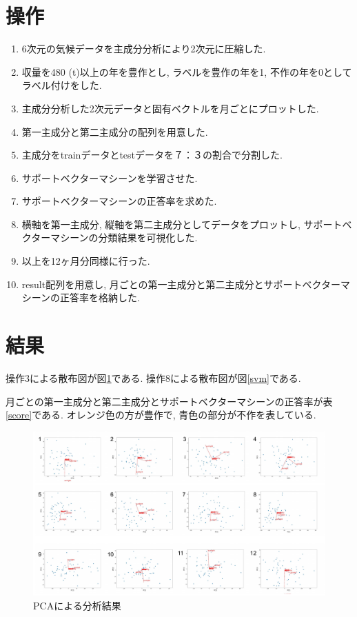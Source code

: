 \documentclass{jarticle}
\begin{document}
\hypertarget{header-n2026}{%
\section{操作}\label{header-n2026}}

\begin{enumerate}
\def\labelenumi{\arabic{enumi}.}
\item
  6次元の気候データを主成分分析により2次元に圧縮した.
\item
  収量を480 (t)以上の年を豊作とし, ラベルを豊作の年を1,
  不作の年を0としてラベル付けをした.
\item
  主成分分析した2次元データと固有ベクトルを月ごとにプロットした.
\item
  第一主成分と第二主成分の配列を用意した.
\item
  主成分をtrainデータとtestデータを７：３の割合で分割した.
\item
  サポートベクターマシーンを学習させた.
\item
  サポートベクターマシーンの正答率を求めた.
\item
  横軸を第一主成分, 縦軸を第二主成分としてデータをプロットし,
  サポートベクターマシーンの分類結果を可視化した.
\item
  以上を12ヶ月分同様に行った.
\item
  result配列を用意し,
  月ごとの第一主成分と第二主成分とサポートベクターマシーンの正答率を格納した.
\end{enumerate}

\hypertarget{header-n2048}{%
\section{結果}\label{header-n2048}}

操作3による散布図が図\ref{pca}である. 操作8による散布図が図\ref{svm}である.

月ごとの第一主成分と第二主成分とサポートベクターマシーンの正答率が表\ref{score}である.
オレンジ色の方が豊作で, 青色の部分が不作を表している.

\begin{figure}[H]
\centering
\includegraphics[keepaspectratio, scale=0.56]
{pca_plot.pdf}
\caption{PCAによる分析結果}
\label{pca}
\end{figure}
\end{document}
